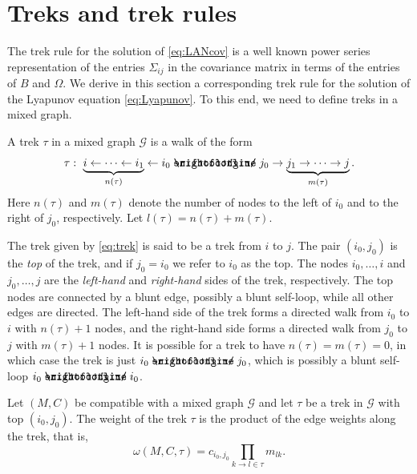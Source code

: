 \documentclass[10pt,twoside,a4paper]{amsart}
\DeclareRobustCommand{\unEdge}{%
	\mathrel{%
		\text{%
			\ooalign{$\rightfootline$\cr\reflectbox{$\rightfootline$}\cr}%
		}%
	}%
}
\begin{document}
\section{Treks and trek rules} \label{sec:treks}
The trek rule for the solution of
\eqref{eq:LANcov} is a well known power series representation of the entries
$\Sigma_{ij}$ in the covariance matrix in terms of the entries of $B$ and
$\Omega$. We derive in this section a corresponding trek rule for the solution
of the Lyapunov equation \eqref{eq:Lyapunov}. To this end, we need to define 
treks in a mixed graph.

\begin{definition}
    A trek $\tau$ in a mixed graph $\mathcal{G}$ is a walk of the form
    \begin{equation} \label{eq:trek}
        \tau: \ \underbrace{i \leftarrow \cdots \leftarrow i_1}_{n(\tau)} 
        \leftarrow i_0 \unEdge j_0 \rightarrow \underbrace{j_1
          \rightarrow \cdots \rightarrow j}_{m(\tau)}.
    \end{equation}
    Here $n(\tau)$ and $m(\tau)$ denote the number of nodes to the left
    of $i_0$ and to the right of $j_0$, respectively. Let $l(\tau) = n(\tau) + m(\tau)$.
\end{definition}

The trek given by \eqref{eq:trek} is said to be a trek from $i$ to $j$. 
The pair $(i_0, j_0)$ is the \emph{top} of the trek, 
and if $j_0 = i_0$ we refer to $i_0$ as the top. 
The nodes $i_0, \ldots, i$ and $j_0, \ldots, j$ are the \emph{left-hand}
and \emph{right-hand} sides of the trek, respectively. The top nodes are 
connected by a blunt edge, possibly a blunt self-loop, while all other edges are directed. 
The left-hand side of the trek forms a directed walk from $i_0$ to $i$ with 
$n(\tau) + 1$ nodes, and the right-hand side forms a directed walk from $j_0$ to $j$
with $m(\tau) + 1$ nodes. It is possible for a trek to have $n(\tau) = m(\tau) = 0$,
in which case the trek is just $i_0 \unEdge j_0$, which is possibly a 
blunt self-loop $i_0 \unEdge i_0$.

\begin{definition} Let $(M, C)$ be compatible with a mixed graph $\mathcal{G}$
    and let $\tau$ be a trek in $\mathcal{G}$ with top $(i_0, j_0)$. 
    The weight of the trek $\tau$ is the product of the edge weights
    along the trek, that is, 
    $$\omega(M, C, \tau) = c_{i_0, j_0} 
    \prod_{k \rightarrow l \in \tau} m_{lk}.$$
\end{definition}
\end{document}
